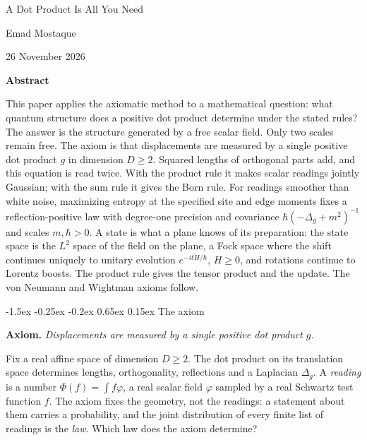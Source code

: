 \documentclass[10pt,a4paper]{article}
\makeatletter
\renewcommand\section{\@startsection{section}{1}{\z@}%
  {-1.5ex \@plus -0.25ex \@minus -0.2ex}%
  {0.65ex \@plus 0.15ex}%
  {\normalfont\large\bfseries}}
\makeatother
\begin{document}
\begin{center}
  {\LARGE A Dot Product Is All You Need\par}
  \vspace{0.7em}
  {\large Emad Mostaque\par}
{\small 26 November 2026\par}
\end{center}
\vspace{0.3em}

\begin{center}
\begin{minipage}{0.89\textwidth}
\small
\begin{center}\textbf{Abstract}\end{center}
\vspace{-0.4em}
\noindent This paper applies the axiomatic method to a mathematical question: what quantum structure does a positive dot product determine under the stated rules? The answer is the structure generated by a free scalar field. Only two scales remain free. The axiom is that displacements are measured by a single positive dot product $g$ in dimension $D \ge 2$. Squared lengths of orthogonal parts add, and this equation is read twice. With the product rule it makes scalar readings jointly Gaussian; with the sum rule it gives the Born rule. For readings smoother than white noise, maximizing entropy at the specified site and edge moments fixes a reflection-positive law with degree-one precision and covariance $\hbar(-\Delta_g + m^2)^{-1}$ and scales $m, \hbar > 0$. A state is what a plane knows of its preparation: the state space is the $L^2$ space of the field on the plane, a Fock space where the shift continues uniquely to unitary evolution $e^{-itH/\hbar}$, $H \ge 0$, and rotations continue to Lorentz boosts. The product rule gives the tensor product and the update. The von Neumann and Wightman axioms follow.
\end{minipage}
\end{center}
\vspace{0.2em}

\section{The axiom}

\noindent\textbf{Axiom.} \textit{Displacements are measured by a single positive dot product $g$.}

\medskip
Fix a real affine space of dimension $D \ge 2$. The dot product on its translation space determines lengths, orthogonality, reflections and a Laplacian $\Delta_g$. A \textit{reading} is a number $\Phi(f) = \int f\varphi$, a real scalar field $\varphi$ sampled by a real Schwartz test function $f$. The axiom fixes the geometry, not the readings: a statement about them carries a probability, and the joint distribution of every finite list of readings is the \textit{law}. Which law does the axiom determine?
\end{document}
